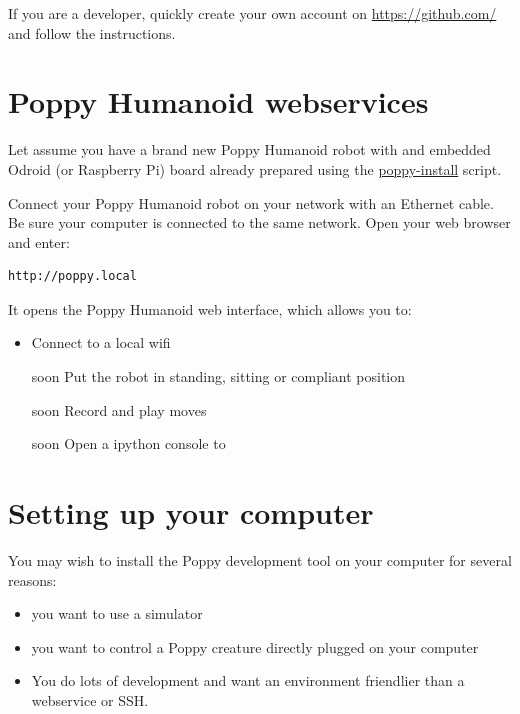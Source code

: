 \documentclass{article}
\begin{document}
If you are a developer, quickly create your own account on \url{https://github.com/} and follow the instructions.



\section{Poppy Humanoid webservices}
\label{poppy-webservices}

Let assume you have a brand new Poppy Humanoid robot with and embedded Odroid (or Raspberry Pi) board already prepared using the \href{https://github.com/poppy-project/poppy_install}{poppy-install} script.

Connect your Poppy Humanoid robot on your network with an Ethernet cable. Be sure your computer is connected to the same network. Open your web browser and enter:

\begin{verbatim}
http://poppy.local
\end{verbatim}

It opens the Poppy Humanoid web interface, which allows you to:

\begin{itemize}
\item Connect to a local wifi
\item [soon] Put the robot in standing, sitting or compliant position
\item [soon] Record and play moves
\item [soon] Open a ipython console to 
\end{itemize}


\section{Setting up your computer}
\label{installing-pypot}
You may wish to install the Poppy development tool on your computer for several reasons:

\begin{itemize}
\item you want to use a simulator
\item you want to control a Poppy creature directly plugged on your computer
\item You do lots of development and want an environment friendlier than a webservice or SSH.
\end{itemize}
\end{document}
